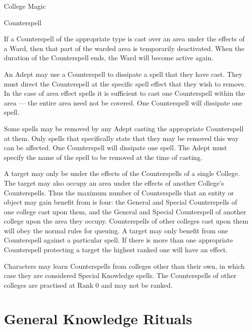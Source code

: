 \begin{Chapter}{College Magic}
\begin{spell}{Counterspell}
\begin{effects}
\begin{Itemize}
\item If a Counterspell of the appropriate type is cast over an area
  under the effects of a Ward, then that part of the warded area is
  temporarily deactivated.  When the duration of the Counterspell
  ends, the Ward will become active again.

\item An Adept may use a Counterspell to dissipate a spell that they
  have cast.  They must direct the Counterspell at the specific spell
  effect that they wish to remove.  In the case of area effect spells
  it is sufficient to cast one Counterspell within the area — the
  entire area need not be covered.  One Counterspell will dissipate
  one spell.

\item Some spells may be removed by any Adept casting the appropriate
  Counterspell at them. Only spells that specifically state that they
  may be removed this way can be affected. One Counterspell will
  dissipate one spell.  The Adept must specify the name of the spell
  to be removed at the time of casting.

\end{Itemize}
  
A target may only be under the effects of the Counterspells of a
single College.  The target may also occupy an area under the effects
of another College’s Counterspells.  Thus the maximum number of
Counterspells that an entity or object may gain benefit from is four:
the General and Special Counterspells of one college cast upon them,
and the General and Special Counterspell of another college upon the
area they occupy.  Counterspells of other colleges cast upon them will
obey the normal rules for queuing.  A target may only benefit from one
Counterspell against a particular spell. If there is more than one
appropriate Counterspell protecting a target the highest ranked one
will have an effect.
\end{effects}
\end{spell}

Characters may learn Counterspells from colleges other than their own,
in which case they are considered Special Knowledge spells.  The
Counterspells of other colleges are practised at Rank 0 and may not be
ranked.


\section{General Knowledge Rituals}


\end{Chapter}
